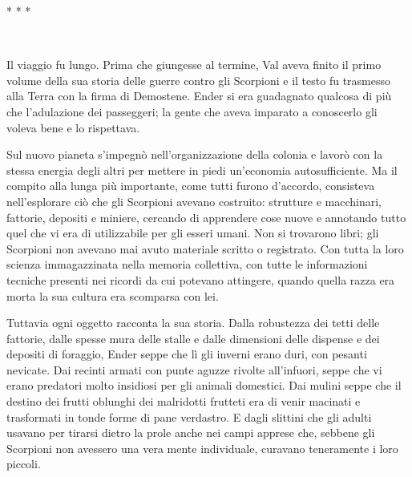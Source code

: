 \begin{center}
	{* * *}
\end{center}

{~}

{Il viaggio fu lungo. Prima che giungesse al termine, Val aveva finito
	il primo volume della sua storia delle guerre contro gli Scorpioni e il
	testo fu trasmesso alla Terra con la firma di Demostene. Ender si era
	guadagnato qualcosa di più che l'adulazione dei passeggeri; la gente che
	aveva imparato a conoscerlo gli voleva bene e lo rispettava.}

{Sul nuovo pianeta s'impegnò nell'organizzazione della colonia e lavorò
	con la stessa energia degli altri per mettere in piedi un'economia
	autosufficiente. Ma il compito alla lunga più importante, come tutti
	furono d'accordo, consisteva nell'esplorare ciò che gli Scorpioni
	avevano costruito: strutture e macchinari, fattorie, depositi e miniere,
	cercando di apprendere cose nuove e annotando tutto quel che vi era di
	utilizzabile per gli esseri umani. Non si trovarono libri; gli Scorpioni
	non avevano mai avuto materiale scritto o registrato. Con tutta la loro
	scienza immagazzinata nella memoria collettiva, con tutte le
	informazioni tecniche presenti nei ricordi da cui potevano attingere,
	quando quella razza era morta la sua cultura era scomparsa con lei.}

{Tuttavia ogni oggetto racconta la sua storia. Dalla robustezza dei
	tetti delle fattorie, dalle spesse mura delle stalle e dalle dimensioni
	delle dispense e dei depositi di foraggio, Ender seppe che lì gli
	inverni erano duri, con pesanti nevicate. Dai recinti armati con punte
	aguzze rivolte all'infuori, seppe che vi erano predatori molto insidiosi
	per gli animali domestici. Dai mulini seppe che il destino dei frutti
	oblunghi dei malridotti frutteti era di venir macinati e trasformati in
	tonde forme di pane verdastro. E dagli slittini che gli adulti usavano
	per tirarsi dietro la prole anche nei campi apprese che, sebbene gli
	Scorpioni non avessero una vera mente individuale, curavano teneramente
	i loro piccoli.}

